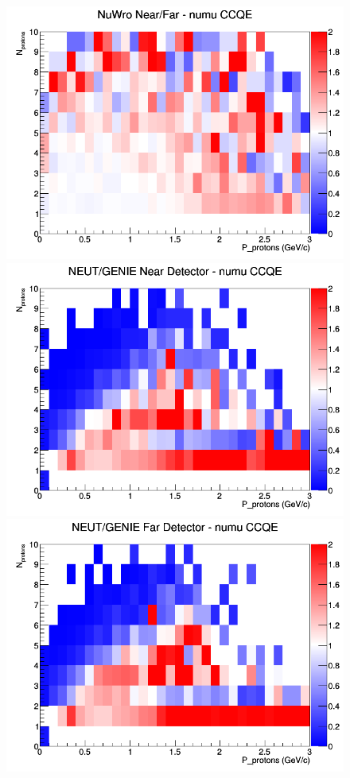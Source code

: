 \begin{figure}[h]
\endminipage
{}
\includegraphics[width=\linewidth]{N_P/nominal/protons/ratios/CCQE_NuWro_numu_NF_N_P.png}
\endminipage
\newline
{}
\includegraphics[width=\linewidth]{N_P/nominal/protons/ratios/CCQE_NEUT_GENIE_numu_near_N_P.png}
\endminipage
{}
\includegraphics[width=\linewidth]{N_P/nominal/protons/ratios/CCQE_NEUT_GENIE_numu_far_N_P.png}

\end{figure}
